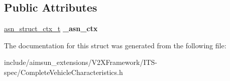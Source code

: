 \subsection*{Public Attributes}
\begin{DoxyCompactItemize}
\item 
\hyperlink{structasn__struct__ctx__s}{asn\+\_\+struct\+\_\+ctx\+\_\+t} {\bfseries \+\_\+asn\+\_\+ctx}\hypertarget{structCompleteVehicleCharacteristics_1_1CompleteVehicleCharacteristics____trailer_aeb666deec9754ab85b3947a9cd36c4ed}{}\label{structCompleteVehicleCharacteristics_1_1CompleteVehicleCharacteristics____trailer_aeb666deec9754ab85b3947a9cd36c4ed}

\end{DoxyCompactItemize}


The documentation for this struct was generated from the following file\+:\begin{DoxyCompactItemize}
\item 
include/aimsun\+\_\+extensions/\+V2\+X\+Framework/\+I\+T\+S-\/spec/Complete\+Vehicle\+Characteristics.\+h\end{DoxyCompactItemize}
